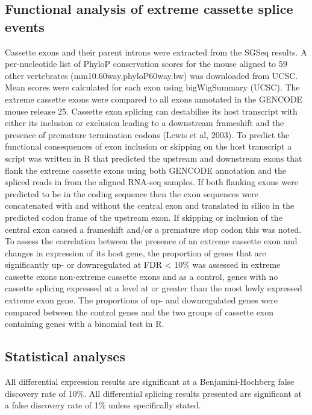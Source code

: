 \subsection{Functional analysis of extreme cassette splice events}
Cassette exons and their parent introns were extracted from the SGSeq results.
A per-nucleotide list of  PhyloP  conservation  scores \citep{Pollard2010-fj} for  the mouse  aligned  to  59  other  vertebrates (mm10.60way.phyloP60way.bw) was downloaded from UCSC. Mean scores were calculated for each exon  using  bigWigSummary  (UCSC). The  extreme  cassette  exons  were  compared  to  all  exons annotated in the GENCODE mouse release 25. Cassette exon splicing can destabilise its host transcript with either its inclusion or exclusion leading to a downstream frameshift and the presence of premature termination codons (Lewis et al, 2003). 
To predict the functional consequences of exon inclusion or skipping on the host transcript a script was written in R that predicted the upstream and downstream exons that  flank the extreme cassette exons using both GENCODE annotation and the spliced reads in from the aligned RNA-seq samples. If both flanking exons were predicted to be in the coding sequence then the exon sequences were concatenated with and without the central exon and translated in silico in the predicted codon frame of the upstream exon. If skipping or inclusion of the central exon caused a frameshift and/or a premature stop codon this was noted. 
To  assess  the  correlation  between  the  presence  of  an  extreme  cassette  exon  and  changes  in expression of its host gene, the proportion of genes that are significantly up- or downregulated at FDR < 10\% was assessed in extreme cassette exons non-extreme cassette exons and as a control, genes with no cassette splicing expressed at a level at or greater than the most lowly expressed extreme exon gene. The proportions of up- and downregulated genes were compared between  the control genes and the two groups of cassette exon containing genes with a binomial test in R.   

\subsection{Statistical analyses}
All differential expression results are significant at a Benjamini-Hochberg false discovery rate of 10\%. 
All  differential  splicing  results  presented  are  significant  at  a  false  discovery  rate  of  1\%  unless specifically stated.


